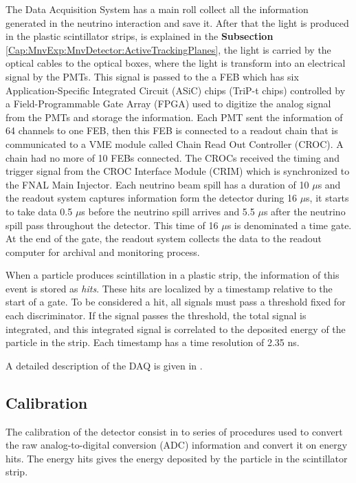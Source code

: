 The Data Acquisition System has a main roll collect all the information generated in the neutrino interaction and save it. After that the light is produced in the plastic scintillator strips, is explained in the \textbf{Subsection} \ref{Cap:MnvExp:MnvDetector:ActiveTrackingPlanes}, the light is carried by the optical cables to the optical boxes, where the light is transform into an electrical signal by the PMTs. This signal is passed to the a FEB which has six Application-Specific Integrated Circuit (ASiC) chips (TriP-t chips)\cite{osti_1012682} controlled by a Field-Programmable Gate Array (FPGA) used to digitize the analog signal from the PMTs and storage the information. Each PMT sent the information of 64 channels to one FEB, then this FEB is connected to a readout chain that is communicated to a VME\cite{VMEModule} module called Chain Read Out Controller (CROC). A chain had no more of 10 FEBs connected. The CROCs received the timing and trigger signal from the CROC Interface Module (CRIM) which is synchronized to the FNAL Main Injector. Each neutrino beam spill has a duration of 10 $\mu$s and the readout system captures information form the detector during 16 $\mu$s, it starts to take data 0.5 $\mu$s before the neutrino spill arrives and 5.5 $\mu$s after the neutrino spill pass throughout the detector. This time of 16 $\mu$s is denominated a time gate. At the end of the gate, the readout system collects the data to the readout computer for archival and monitoring process.

When a particle produces scintillation in a plastic strip, the information of this event is stored as \textit{hits}. These hits are localized by a timestamp relative to the start of a gate. To be considered a hit, all signals must pass a threshold fixed for each discriminator. If the signal passes the threshold, the total signal is integrated, and this integrated signal is correlated to the deposited energy of the particle in the strip. Each timestamp has a time resolution of 2.35 ns. 

A detailed description of the DAQ is given in \cite{DAQPERDUE2012179}.

\subsection{Calibration}
\label{Cap:MnvExp:MnvDetector:Calibration}

The calibration of the detector consist in to series of procedures used to convert the raw analog-to-digital conversion (ADC) information and convert it on energy hits. The energy hits gives the energy deposited by the particle in the scintillator strip. 



